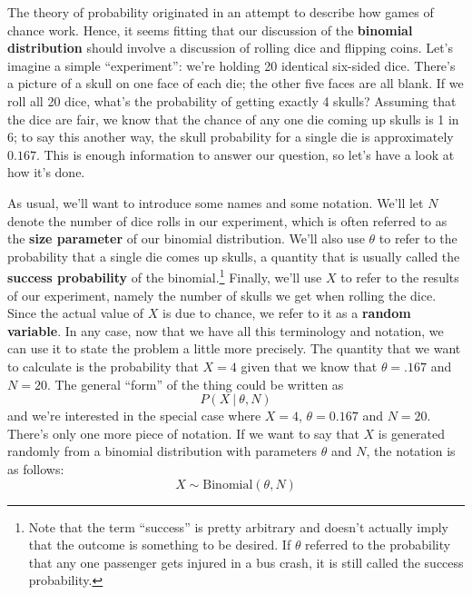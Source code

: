 \documentclass[
]{book}
\theoremstyle{definition}
\theoremstyle{definition}
\theoremstyle{definition}
\theoremstyle{definition}
\theoremstyle{remark}
\begin{document}
The theory of probability originated in an attempt to describe how games of chance work. Hence, it seems fitting that our discussion of the \textbf{binomial distribution} should involve a discussion of rolling dice and flipping coins. Let's imagine a simple ``experiment'': we're holding 20 identical six-sided dice. There's a picture of a skull on one face of each die; the other five faces are all blank. If we roll all 20 dice, what's the probability of getting exactly 4 skulls? Assuming that the dice are fair, we know that the chance of any one die coming up skulls is 1 in 6; to say this another way, the skull probability for a single die is approximately \(0.167\). This is enough information to answer our question, so let's have a look at how it's done.

As usual, we'll want to introduce some names and some notation. We'll let \(N\) denote the number of dice rolls in our experiment, which is often referred to as the \textbf{size parameter} of our binomial distribution. We'll also use \(\theta\) to refer to the probability that a single die comes up skulls, a quantity that is usually called the \textbf{success probability} of the binomial.\footnote{Note that the term ``success'' is pretty arbitrary and doesn't actually imply that the outcome is something to be desired. If \(\theta\) referred to the probability that any one passenger gets injured in a bus crash, it is still called the success probability.} Finally, we'll use \(X\) to refer to the results of our experiment, namely the number of skulls we get when rolling the dice. Since the actual value of \(X\) is due to chance, we refer to it as a \textbf{random variable}. In any case, now that we have all this terminology and notation, we can use it to state the problem a little more precisely. The quantity that we want to calculate is the probability that \(X = 4\) given that we know that \(\theta = .167\) and \(N=20\). The general ``form'' of the thing could be written as
\[
P(X \ | \ \theta, N)
\]
and we're interested in the special case where \(X=4\), \(\theta = 0.167\) and \(N=20\).
There's only one more piece of notation. If we want to say that \(X\) is generated randomly from a binomial distribution with parameters \(\theta\) and \(N\), the notation is as follows:
\[
X \sim \mbox{Binomial}(\theta, N)
\]
\end{document}
